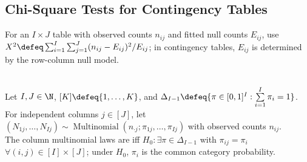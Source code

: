 \subsection{Chi-Square Tests for Contingency Tables}

For an $I\times J$ table with observed counts $n_{ij}$ and fitted null counts $E_{ij}$, use $X^2\defeq\sum_{i=1}^{I}\sum_{j=1}^{J}(n_{ij}-E_{ij})^2/E_{ij}$; in contingency tables, $E_{ij}$ is determined by the row-column null model.

\begin{definition} \label{def:chi-square-test-of-homogeneity} \\
Let $I,J\in\N$, $[K]\defeq\{1,\ldots,K\}$, and $\Delta_{I-1}\defeq\{\pi\in[0,1]^I:\sum\limits_{i=1}^{I}\pi_i=1\}$.\\
For independent columns $j\in[J]$, let $(N_{1j},\ldots,N_{Ij})\sim\operatorname{Multinomial}(n_{\cdot j};\pi_{1j},\ldots,\pi_{Ij})$ with observed counts $n_{ij}$.\\
The column multinomial laws are  iff $H_0:\exists\pi\in\Delta_{I-1}$ with $\pi_{ij}=\pi_i$ $\forall(i,j)\in[I]\times[J]$; under $H_0$, $\pi_i$ is the common category probability.
\end{definition}

